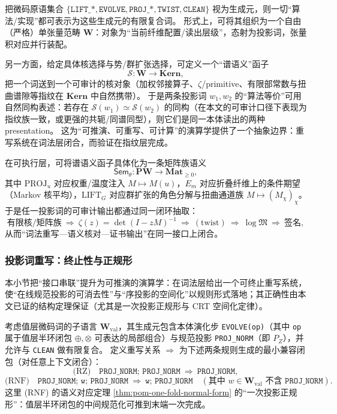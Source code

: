 \begin{remark}[投影词范畴与“算法等价 = 自然同构”的口径]\label{rem:pom-word-category}
把微码原语集合
\(
\{\texttt{LIFT\_*},\texttt{EVOLVE},\texttt{PROJ\_*},\texttt{TWIST},\texttt{CLEAN}\}
\)
视为生成元，则一切“算法/实现”都可表示为这些生成元的有限复合词。
形式上，可将其组织为一个自由（严格）单张量范畴 \(\mathbf{W}\)：对象为“当前纤维配置/读出层级”，态射为投影词，张量积对应并行装配。

另一方面，给定具体核选择与势/群扩张选择，可定义一个“谱语义”函子
\[
\mathcal{S}:\mathbf{W}\to \mathbf{Kern},
\]
把一个词送到一个可审计的核对象（加权邻接算子、\(\zeta\)/primitive、有限部常数与扭曲谱隙等指纹在 \(\mathbf{Kern}\) 中自然携带）。
于是两条投影词 \(w_1,w_2\) 的“算法等价”可用自然同构表述：若存在 \(\mathcal{S}(w_1)\simeq \mathcal{S}(w_2)\) 的同构（在本文的可审计口径下表现为指纹族一致，或更强的共轭/同谱同型），则它们是同一本体读出的两种 presentation。
这为“可推演、可重写、可计算”的演算学提供了一个抽象边界：重写系统在词法层闭合，而验证在指纹层完成。
\end{remark}

\begin{remark}\label{rem:pom-sem-functor-loop}
在可执行层，可将谱语义函子具体化为一条矩阵族语义
\[
\mathsf{Sem}_\theta:\mathbf{PW}\to \mathbf{Mat}_{\ge 0},
\]
其中 \(\mathrm{PROJ}_u\) 对应权重/温度注入 \(M\mapsto M(u)\)，\(E_m\) 对应折叠纤维上的条件期望（Markov 核平均），\(\mathrm{LIFT}_G\) 对应群扩张的角色分解与扭曲通道族 \(M\mapsto (M_\chi)_\chi\)。
于是任一投影词的可审计输出都通过同一闭环抽取：
\[
\text{有限核/矩阵族}\ \Rightarrow\ \zeta(z)=\det(I-zM)^{-1}\ \Rightarrow\ (\text{twist})\ \Rightarrow\ \log\mathfrak{M}\ \Rightarrow\ \text{签名},
\]
从而“词法重写—语义核对—证书输出”在同一接口上闭合。
\end{remark}

\subsubsection{投影词重写：终止性与正规形}\label{subsec:pom-rewriting-calculus}
本小节把“接口串联”提升为可推演的演算学：在词法层给出一个可终止重写系统，使“在线规范投影的可消去性”与“序投影的空间化”以规则形式落地；其正确性由本文已证的结构定理保证（尤其是一次投影正规形与 CRT 空间化定律）。

\begin{definition}[值层投影词语言与规范化重写]\label{def:pom-rewriting-val}
考虑值层微码词的子语言 \(\mathbf{W}_{\mathrm{val}}\)，其生成元包含本体演化步 \texttt{EVOLVE(op)}（其中 \texttt{op} 属于值层半环闭包 \(\oplus,\otimes\) 可表达的局部组合）与规范投影 \texttt{PROJ\_NORM}（即 \(P_Z\)），并允许与 \texttt{CLEAN} 做有限复合。
定义重写关系 \(\Rightarrow\) 为下述两条规则生成的最小兼容闭包（对任意上下文闭合）：
\[
\text{(RZ)}\quad
\texttt{PROJ\_NORM;\ PROJ\_NORM}\ \Rightarrow\ \texttt{PROJ\_NORM},
\]
\[
\text{(RNF)}\quad
\texttt{PROJ\_NORM;\ w;\ PROJ\_NORM}\ \Rightarrow\ \texttt{w;\ PROJ\_NORM}
\quad (\text{其中 }w\in\mathbf{W}_{\mathrm{val}}\text{ 不含 }\texttt{PROJ\_NORM}).
\]
这里 (RNF) 的语义对应定理 \ref{thm:pom-one-fold-normal-form} 的“一次投影正规形”：值层半环闭包的中间规范化可推到末端一次完成。
\end{definition}

